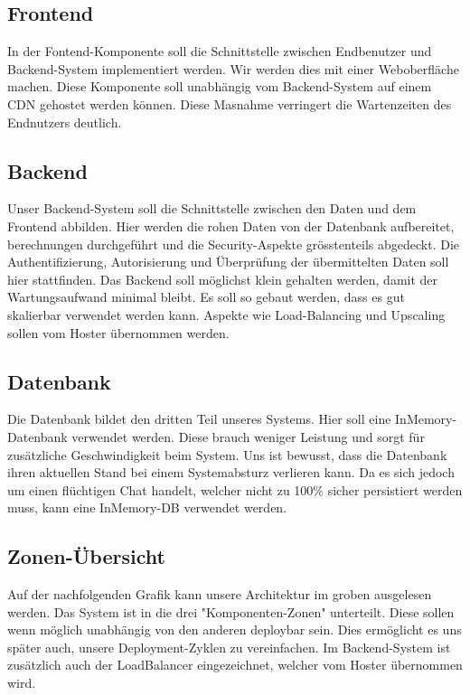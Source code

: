 \documentclass[12pt]{article}
\begin{document}
	\subsection{Frontend}
	In der Fontend-Komponente soll die Schnittstelle zwischen Endbenutzer und Backend-System implementiert werden. Wir werden dies mit einer Weboberfläche machen. Diese Komponente soll unabhängig vom Backend-System auf einem CDN gehostet werden können. Diese Masnahme verringert die Wartenzeiten des Endnutzers deutlich.
	\subsection{Backend}
	Unser Backend-System soll die Schnittstelle zwischen den Daten und dem Frontend abbilden. Hier werden die rohen Daten von der Datenbank aufbereitet, berechnungen durchgeführt und die Security-Aspekte grösstenteils abgedeckt. Die Authentifizierung, Autorisierung und Überprüfung der übermittelten Daten soll hier stattfinden. Das Backend soll möglichst klein gehalten werden, damit der Wartungsaufwand minimal bleibt. Es soll so gebaut werden, dass es gut skalierbar verwendet werden kann. Aspekte wie Load-Balancing und Upscaling sollen vom Hoster übernommen werden.
	\subsection{Datenbank}
	Die Datenbank bildet den dritten Teil unseres Systems. Hier soll eine InMemory-Datenbank verwendet werden. Diese brauch weniger Leistung und sorgt für zusätzliche Geschwindigkeit beim System. Uns ist bewusst, dass die Datenbank ihren aktuellen Stand bei einem Systemabsturz verlieren kann. Da es sich jedoch um einen flüchtigen Chat handelt, welcher nicht zu 100\% sicher persistiert werden muss, kann eine InMemory-DB verwendet werden.
	
	\newpage
	
	\subsection{Zonen-Übersicht}
	Auf der nachfolgenden Grafik kann unsere Architektur im groben ausgelesen werden. Das System ist in die drei "Komponenten-Zonen" unterteilt. Diese sollen wenn möglich unabhängig von den anderen deploybar sein. Dies ermöglicht es uns später auch, unsere Deployment-Zyklen zu vereinfachen. Im Backend-System ist zusätzlich auch der LoadBalancer eingezeichnet, welcher vom Hoster übernommen wird.\newline
	
\end{document}
